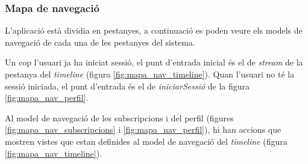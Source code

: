 


\subsubsection{Mapa de navegació}

L'aplicació està dividia en pestanyes, a continuació es poden veure els models de navegació de cada una de les pestanyes del sistema. 

Un cop l'usuari ja ha iniciat sessió, el punt d'entrada inicial és el de \textit{stream} de la pestanya del \textit{timeline} (figura \ref{fig:mapa_nav_timeline}). Quan l'usuari no té la sessió iniciada, el punt d'entrada és el de \textit{iniciarSessió} de la figura \ref{fig:mapa_nav_perfil}.

Al model de navegació de les subscripcions i del perfil (figures \ref{fig:mapa_nav_subscripcions} i \ref{fig:mapa_nav_perfil}), hi han accions que mostren vistes que estan definides al model de navegació del \textit{timeline} (figura \ref{fig:mapa_nav_timeline}).


